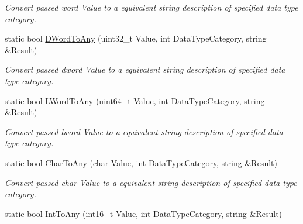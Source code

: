 \begin{DoxyCompactItemize}
\begin{DoxyCompactList}\small\item\em Convert passed word Value to a equivalent string description of specified data type category. \end{DoxyCompactList}\item 
static bool \hyperlink{classpc__emulator_1_1DataTypeUtils_a3d2aebc4144750c83233a935494bbd0b}{D\+Word\+To\+Any} (uint32\+\_\+t Value, int Data\+Type\+Category, string \&Result)\hypertarget{classpc__emulator_1_1DataTypeUtils_a3d2aebc4144750c83233a935494bbd0b}{}\label{classpc__emulator_1_1DataTypeUtils_a3d2aebc4144750c83233a935494bbd0b}

\begin{DoxyCompactList}\small\item\em Convert passed dword Value to a equivalent string description of specified data type category. \end{DoxyCompactList}\item 
static bool \hyperlink{classpc__emulator_1_1DataTypeUtils_aaa48015d360664699a240cd900055977}{L\+Word\+To\+Any} (uint64\+\_\+t Value, int Data\+Type\+Category, string \&Result)\hypertarget{classpc__emulator_1_1DataTypeUtils_aaa48015d360664699a240cd900055977}{}\label{classpc__emulator_1_1DataTypeUtils_aaa48015d360664699a240cd900055977}

\begin{DoxyCompactList}\small\item\em Convert passed lword Value to a equivalent string description of specified data type category. \end{DoxyCompactList}\item 
static bool \hyperlink{classpc__emulator_1_1DataTypeUtils_abe6ad0fa1288a76c81afc1942a6af75c}{Char\+To\+Any} (char Value, int Data\+Type\+Category, string \&Result)\hypertarget{classpc__emulator_1_1DataTypeUtils_abe6ad0fa1288a76c81afc1942a6af75c}{}\label{classpc__emulator_1_1DataTypeUtils_abe6ad0fa1288a76c81afc1942a6af75c}

\begin{DoxyCompactList}\small\item\em Convert passed char Value to a equivalent string description of specified data type category. \end{DoxyCompactList}\item 
static bool \hyperlink{classpc__emulator_1_1DataTypeUtils_a670972c6d0ff39ed1847f5faf9c70ee6}{Int\+To\+Any} (int16\+\_\+t Value, int Data\+Type\+Category, string \&Result)\hypertarget{classpc__emulator_1_1DataTypeUtils_a670972c6d0ff39ed1847f5faf9c70ee6}{}\label{classpc__emulator_1_1DataTypeUtils_a670972c6d0ff39ed1847f5faf9c70ee6}


\end{DoxyCompactItemize}
